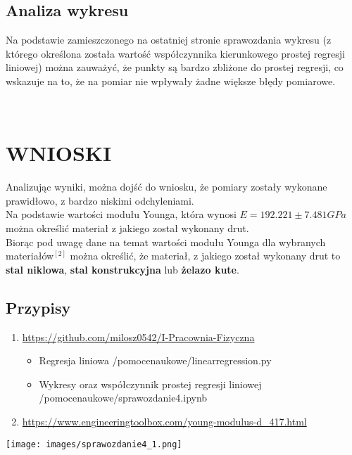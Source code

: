 \documentclass{article}
\begin{document}
{\subsection*{Analiza wykresu}
Na podstawie zamieszczonego na ostatniej stronie sprawozdania wykresu (z którego określona została wartość współczynnika kierunkowego prostej regresji liniowej) można zauważyć, że punkty są bardzo zbliżone do prostej regresji, co wskazuje na to, że na pomiar nie wpływały żadne większe błędy pomiarowe.
}\\


\section*{WNIOSKI}

{Analizując wyniki, można dojść do wniosku, że pomiary zostały wykonane prawidłowo, z bardzo niskimi odchyleniami. \\
Na podstawie wartości modułu Younga, która wynosi $E = 192.221\pm 7.481GPa$ można określić materiał z jakiego został wykonany drut. \\
Biorąc pod uwagę dane na temat wartości modułu Younga dla wybranych materiałów$^{[2]}$ można określić, że materiał, z jakiego został wykonany drut to \textbf{stal niklowa}, \textbf{stal konstrukcyjna} lub \textbf{żelazo kute}.

\subsection*{Przypisy}
\begin{enumerate}
    \item \href{https://github.com/milosz0542/I-Pracownia-Fizyczna}{https://github.com/milosz0542/I-Pracownia-Fizyczna}
    \begin{itemize}
        \item Regresja liniowa /pomocenaukowe/linearregression.py
        \item Wykresy oraz współczynnik prostej regresji liniowej /pomocenaukowe/sprawozdanie4.ipynb
    \end{itemize}
    \item \href{https://www.engineeringtoolbox.com/young-modulus-d\_417.html}{https://www.engineeringtoolbox.com/young-modulus-d\_417.html}
\end{enumerate}
}

\pagebreak
\texttt{[image: images/sprawozdanie4\_1.png]}
\end{document}
